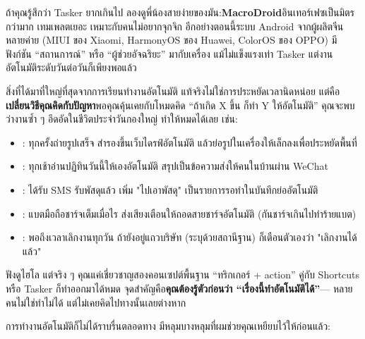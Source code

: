 ถ้าคุณรู้สึกว่า Tasker ยากเกินไป ลองดูพี่น้องสายง่ายของมัน:\textbf{MacroDroid}อินเทอร์เฟซเป็นมิตรกว่ามาก เทมเพลตเยอะ เหมาะกับคนไม่อยากจุกจิก อีกอย่างตอนนี้ระบบ Android จากผู้ผลิตจีนหลายค่าย (MIUI ของ Xiaomi, HarmonyOS ของ Huawei, ColorOS ของ OPPO) มีฟังก์ชัน “สถานการณ์” หรือ “ผู้ช่วยอัจฉริยะ” มากับเครื่อง แม้ไม่แข็งแรงเท่า Tasker แต่งานอัตโนมัติระดับวันต่อวันก็เพียงพอแล้ว


สิ่งที่ได้มาที่ใหญ่ที่สุดจากการเรียนทำงานอัตโนมัติ แท้จริงไม่ใช่การประหยัดเวลานิดหน่อย แต่คือ\textbf{เปลี่ยนวิธีคุณคิดกับปัญหา}พอคุณคุ้นเคยกับโหมดคิด “ถ้าเกิด X ขึ้น ก็ทำ Y ให้อัตโนมัติ” คุณจะพบว่างานซ้ำ ๆ อึดอัดในชีวิตประจำวันกองใหญ่ ทำให้หมดได้เลย เช่น:

\begin{itemize}
  \item : ทุกครั้งถ่ายรูปเสร็จ สำรองขึ้นเว็บไดรฟ์อัตโนมัติ แล้วย่อรูปในเครื่องให้เล็กลงเพื่อประหยัดพื้นที่
  \item : ทุกเช้าอ่านปฏิทินวันนี้ให้เองอัตโนมัติ สรุปเป็นข้อความส่งให้คนในบ้านผ่าน WeChat
  \item : ได้รับ SMS รับพัสดุแล้ว เพิ่ม "ไปเอาพัสดุ" เป็นรายการรอทำในบันทึกย่ออัตโนมัติ
  \item : แบตมือถือชาร์จเต็มเมื่อไร ส่งเสียงเตือนให้ถอดสายชาร์จอัตโนมัติ (กันชาร์จเกินไปทำร้ายแบต)
  \item : พอถึงเวลาเลิกงานทุกวัน ถ้ายังอยู่แถวบริษัท (ระบุด้วยสถานีฐาน) ก็เตือนตัวเองว่า "เลิกงานได้แล้ว"
\end{itemize}

ฟังดูไฮโล แต่จริง ๆ คุณแค่เชี่ยวชาญสองคอนเซปต์พื้นฐาน “ทริกเกอร์ + action” คู่กับ Shortcuts หรือ Tasker ก็ทำออกมาได้หมด จุดสำคัญคือ\textbf{คุณต้องรู้ตัวก่อนว่า “เรื่องนี้ทำอัตโนมัติได้”}— หลายคนไม่ใช่ทำไม่ได้ แต่ไม่เคยคิดไปทางนั้นเลยต่างหาก


การทำงานอัตโนมัติก็ไม่ได้ราบรื่นตลอดทาง มีหลุมบางหลุมที่ผมช่วยคุณเหยียบไว้ให้ก่อนแล้ว:

